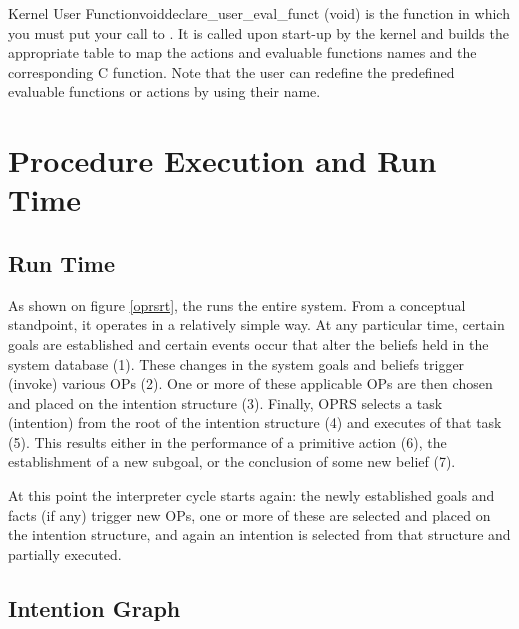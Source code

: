 \begin{typefn}{Kernel User Function}{void}{declare\_user\_eval\_funct} {(void)}
is the function in which you must put your call to
. It is called upon start-up by the
kernel and builds the appropriate table to map the actions and evaluable
functions names and the corresponding C function.  Note that the user can
redefine the predefined evaluable functions or actions by using their
name.
\end{typefn}

\chapter{Procedure Execution and Run Time}



\section{Run Time}


As shown on figure \ref{oprsrt}, the \CPK{} runs the entire system. From a
conceptual standpoint, it operates in a relatively simple way. At any
particular time, certain goals are established and certain events occur
that alter the beliefs held in the system database (1). These changes in
the system goals and beliefs trigger (invoke) various OPs (2). One or more
of these applicable OPs are then chosen and placed on the intention
structure (3). Finally, OPRS selects a task (intention) from the root of
the intention structure (4) and executes  of that task (5).
This results either in the performance of a primitive action (6), the
establishment of a new subgoal, or the conclusion of some new belief (7).

At this point the interpreter cycle starts again: the newly established
goals and facts (if any) trigger new OPs, one or more of these are
selected and placed on the intention structure, and again an intention is
selected from that structure and partially executed.

\section{Intention Graph}

